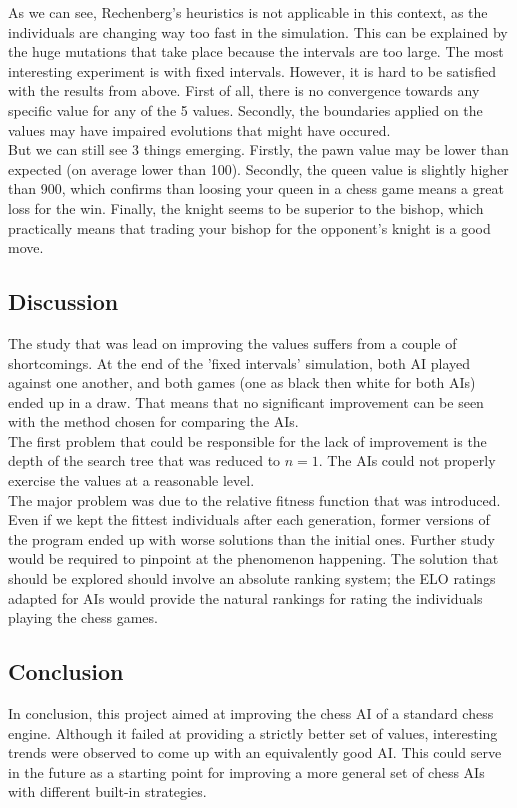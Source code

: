 \documentclass[12pt,a4paper,twocolumn]{article}
\begin{document}
As we can see, Rechenberg's heuristics is not applicable in this context, as the individuals are changing way too fast in the simulation. This can be explained by the huge mutations that take place because the intervals are too large. The most interesting experiment is with fixed intervals. However, it is hard to be satisfied with the results from above. First of all, there is no convergence towards any specific value for any of the 5 values. Secondly, the boundaries applied on the values may have impaired evolutions that might have occured.\\

But we can still see 3 things emerging. Firstly, the pawn value may be lower than expected (on average lower than 100). Secondly, the queen value is slightly higher than 900, which confirms than loosing your queen in a chess game means a great loss for the win. Finally, the knight seems to be superior to the bishop, which practically means that trading your bishop for the opponent's knight is a good move.

\subsection{Discussion}
The study that was lead on improving the values suffers from a couple of shortcomings. At the end of the 'fixed intervals' simulation, both AI played against one another, and both games (one as black then white for both AIs) ended up in a draw. That means that no significant improvement can be seen with the method chosen for comparing the AIs.\\

The first problem that could be responsible for the lack of improvement is the depth of the search tree that was reduced to $n=1$. The AIs could not properly exercise the values at a reasonable level.\\
The major problem was due to the relative fitness function that was introduced. Even if we kept the fittest individuals after each generation, former versions of the program ended up with worse solutions than the initial ones. Further study would be required to pinpoint at the phenomenon happening. The solution that should be explored should involve an absolute ranking system; the ELO ratings adapted for AIs would provide the natural rankings for rating the individuals playing the chess games.

\subsection{Conclusion}
In conclusion, this project aimed at improving the chess AI of a standard chess engine. Although it failed at providing a strictly better set of values, interesting trends were observed to come up with an equivalently good AI. This could serve in the future as a starting point for improving a more general set of chess AIs with different built-in strategies.



\end{document}
